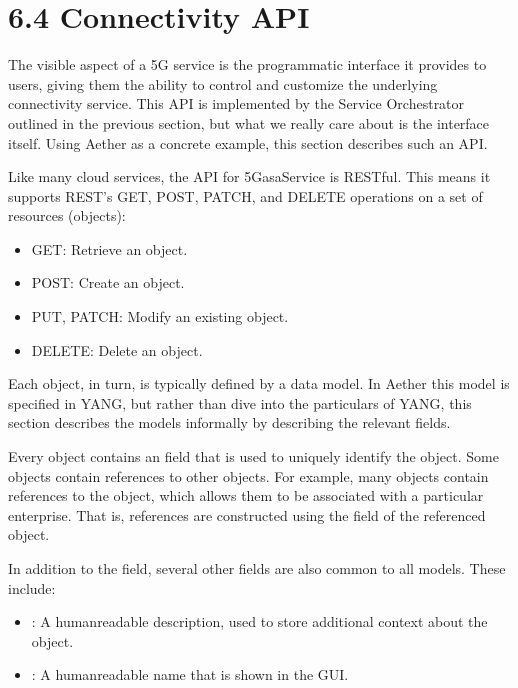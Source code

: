 \documentclass[a4paper,11pt,english]{sphinxmanual}
\begin{document}
\section{6.4 Connectivity API}
\label{\detokenize{cloud:connectivity-api}}
\sphinxAtStartPar
The visible aspect of a 5G service is the programmatic interface it
provides to users, giving them the ability to control and customize
the underlying connectivity service. This API is implemented by the
Service Orchestrator outlined in the previous section, but what we
really care about is the interface itself. Using Aether as a concrete
example, this section describes such an API.

\sphinxAtStartPar
Like many cloud services, the API for 5G\sphinxhyphen{}as\sphinxhyphen{}a\sphinxhyphen{}Service is RESTful.
This means it supports REST’s GET, POST, PATCH, and DELETE operations
on a set of resources (objects):
\begin{itemize}
\item {} 
\sphinxAtStartPar
GET: Retrieve an object.

\item {} 
\sphinxAtStartPar
POST: Create an object.

\item {} 
\sphinxAtStartPar
PUT, PATCH: Modify an existing object.

\item {} 
\sphinxAtStartPar
DELETE: Delete an object.

\end{itemize}

\sphinxAtStartPar
Each object, in turn, is typically defined by a data model. In Aether
this model is specified in YANG, but rather than dive into the
particulars of YANG, this section describes the models informally by
describing the relevant fields.

\sphinxAtStartPar
Every object contains an  field that is used to uniquely identify
the object. Some objects contain references to other objects. For
example, many objects contain references to the  object,
which allows them to be associated with a particular enterprise. That
is, references are constructed using the  field of the referenced
object.

\sphinxAtStartPar
In addition to the  field, several other fields are also common to
all models. These include:
\begin{itemize}
\item {} 
\sphinxAtStartPar
{}: A human\sphinxhyphen{}readable description, used to store additional context about the object.

\item {} 
\sphinxAtStartPar
{}: A human\sphinxhyphen{}readable name that is shown in the GUI.

\end{itemize}
\end{document}
